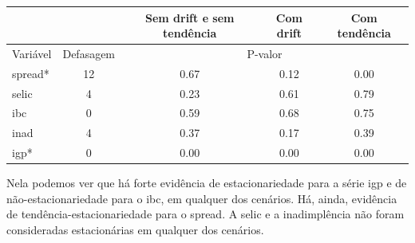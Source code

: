 \documentclass[a4paper,
               article,
               12pt,
               openany,
               oneside,
               english,
               brazil]{abntex2}
\numberwithin{equation}{section}
\begin{document}
    \begin{table}[ht]
        {%
            \begin{tabular}{lcccc}
                \midrule
                & \multicolumn{1}{c}{} & \multicolumn{1}{C{3cm}}{Sem drift e sem tendência} & \multicolumn{1}{C{3cm}}{Com drift} & \multicolumn{1}{C{3cm}}{Com tendência} \\
                \midrule
                Variável & Defasagem & \multicolumn{3}{c}{P-valor} \\
                \midrule
                spread*      &         12 &     0.67 &     0.12 &     0.00 \\
                selic        &          4 &     0.23 &     0.61 &     0.79 \\
                ibc          &          0 &     0.59 &     0.68 &     0.75 \\
                inad         &          4 &     0.37 &     0.17 &     0.39 \\
                igp*         &          0 &     0.00 &     0.00 &     0.00 \\
                \midrule
            \end{tabular}
            } 
            {}
    \end{table}

    Nela podemos ver que há forte evidência de estacionariedade para a série igp e de não-estacionariedade para o ibc, em qualquer dos cenários. Há, ainda, evidência de tendência-estacionariedade para o spread. A selic e a inadimplência não foram consideradas estacionárias em qualquer dos cenários.
\end{document}
